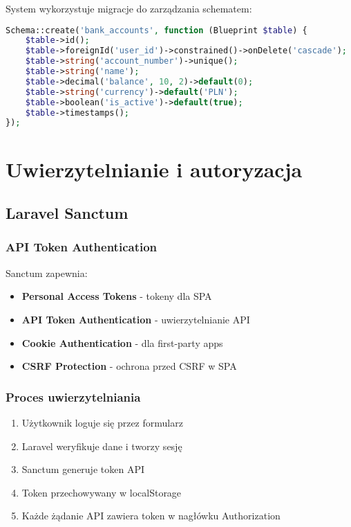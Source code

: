     System wykorzystuje migracje do zarządzania schematem:

    \begin{lstlisting}[language=PHP, caption=Przykład migracji]
Schema::create('bank_accounts', function (Blueprint $table) {
    $table->id();
    $table->foreignId('user_id')->constrained()->onDelete('cascade');
    $table->string('account_number')->unique();
    $table->string('name');
    $table->decimal('balance', 10, 2)->default(0);
    $table->string('currency')->default('PLN');
    $table->boolean('is_active')->default(true);
    $table->timestamps();
});
    \end{lstlisting}

    \section{Uwierzytelnianie i autoryzacja}

    \subsection{Laravel Sanctum}

    \subsubsection{API Token Authentication}
    Sanctum zapewnia:

    \begin{itemize}
        \item \textbf{Personal Access Tokens} - tokeny dla SPA
        \item \textbf{API Token Authentication} - uwierzytelnianie API
        \item \textbf{Cookie Authentication} - dla first-party apps
        \item \textbf{CSRF Protection} - ochrona przed CSRF w SPA
    \end{itemize}

    \subsubsection{Proces uwierzytelniania}

    \begin{enumerate}
        \item Użytkownik loguje się przez formularz
        \item Laravel weryfikuje dane i tworzy sesję
        \item Sanctum generuje token API
        \item Token przechowywany w localStorage
        \item Każde żądanie API zawiera token w nagłówku Authorization
    \end{enumerate}

